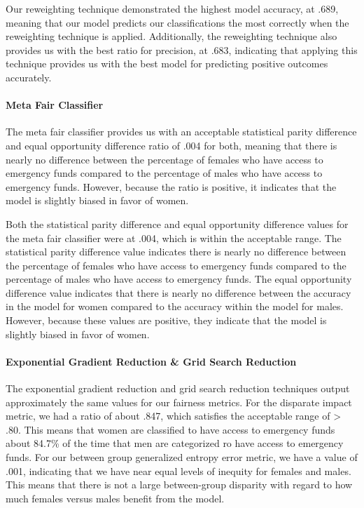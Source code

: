\documentclass[water,article,submit,moreauthors,pdftex]{mdpi}
\begin{document}
Our reweighting technique demonstrated the highest model accuracy, at
.689, meaning that our model predicts our classifications the most
correctly when the reweighting technique is applied. Additionally, the
reweighting technique also provides us with the best ratio for
precision, at .683, indicating that applying this technique provides us
with the best model for predicting positive outcomes accurately.

\hypertarget{meta-fair-classifier}{%
\paragraph{Meta Fair Classifier}\label{meta-fair-classifier}}

The meta fair classifier provides us with an acceptable statistical
parity difference and equal opportunity difference ratio of .004 for
both, meaning that there is nearly no difference between the percentage
of females who have access to emergency funds compared to the percentage
of males who have access to emergency funds. However, because the ratio
is positive, it indicates that the model is slightly biased in favor of
women.

Both the statistical parity difference and equal opportunity difference
values for the meta fair classifier were at .004, which is within the
acceptable range. The statistical parity difference value indicates
there is nearly no difference between the percentage of females who have
access to emergency funds compared to the percentage of males who have
access to emergency funds. The equal opportunity difference value
indicates that there is nearly no difference between the accuracy in the
model for women compared to the accuracy within the model for males.
However, because these values are positive, they indicate that the model
is slightly biased in favor of women.

\hypertarget{exponential-gradient-reduction-grid-search-reduction}{%
\paragraph{Exponential Gradient Reduction \& Grid Search
Reduction}\label{exponential-gradient-reduction-grid-search-reduction}}

The exponential gradient reduction and grid search reduction techniques
output approximately the same values for our fairness metrics. For the
disparate impact metric, we had a ratio of about .847, which satisfies
the acceptable range of \textgreater{} .80. This means that women are
classified to have access to emergency funds about 84.7\% of the time
that men are categorized ro have access to emergency funds. For our
between group generalized entropy error metric, we have a value of .001,
indicating that we have near equal levels of inequity for females and
males. This means that there is not a large between-group disparity with
regard to how much females versus males benefit from the model.
\end{document}
